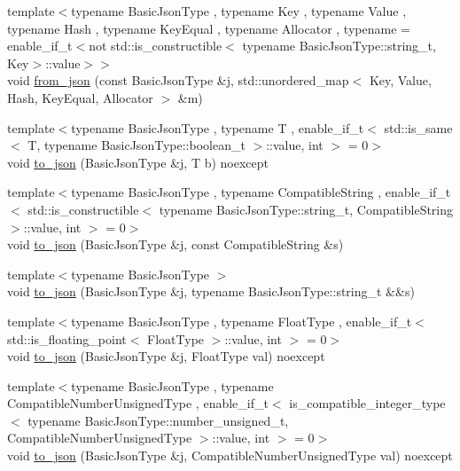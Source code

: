 \begin{DoxyCompactItemize}
\item 
{\footnotesize template$<$typename Basic\+Json\+Type , typename Key , typename Value , typename Hash , typename Key\+Equal , typename Allocator , typename  = enable\+\_\+if\+\_\+t$<$not std\+::is\+\_\+constructible$<$                                     typename Basic\+Json\+Type\+::string\+\_\+t, Key$>$\+::value$>$$>$ }\\void \hyperlink{namespacenlohmann_1_1detail_aef5c8ea108f4d2b03fb4a635617510de}{from\+\_\+json} (const Basic\+Json\+Type \&j, std\+::unordered\+\_\+map$<$ Key, Value, Hash, Key\+Equal, Allocator $>$ \&m)
\item 
{\footnotesize template$<$typename Basic\+Json\+Type , typename T , enable\+\_\+if\+\_\+t$<$ std\+::is\+\_\+same$<$ T, typename Basic\+Json\+Type\+::boolean\+\_\+t $>$\+::value, int $>$  = 0$>$ }\\void \hyperlink{namespacenlohmann_1_1detail_a1a804b98cbe89b7e44b698f2ca860490}{to\+\_\+json} (Basic\+Json\+Type \&j, T b) noexcept
\item 
{\footnotesize template$<$typename Basic\+Json\+Type , typename Compatible\+String , enable\+\_\+if\+\_\+t$<$ std\+::is\+\_\+constructible$<$ typename Basic\+Json\+Type\+::string\+\_\+t, Compatible\+String $>$\+::value, int $>$  = 0$>$ }\\void \hyperlink{namespacenlohmann_1_1detail_a7356ed05cdbbb080cee80e1211e1c6c9}{to\+\_\+json} (Basic\+Json\+Type \&j, const Compatible\+String \&s)
\item 
{\footnotesize template$<$typename Basic\+Json\+Type $>$ }\\void \hyperlink{namespacenlohmann_1_1detail_a4aa1ca6b7c61bf19d1f30ea5b669f68e}{to\+\_\+json} (Basic\+Json\+Type \&j, typename Basic\+Json\+Type\+::string\+\_\+t \&\&s)
\item 
{\footnotesize template$<$typename Basic\+Json\+Type , typename Float\+Type , enable\+\_\+if\+\_\+t$<$ std\+::is\+\_\+floating\+\_\+point$<$ Float\+Type $>$\+::value, int $>$  = 0$>$ }\\void \hyperlink{namespacenlohmann_1_1detail_a22bffdc8bc7e43af380ba2050696b230}{to\+\_\+json} (Basic\+Json\+Type \&j, Float\+Type val) noexcept
\item 
{\footnotesize template$<$typename Basic\+Json\+Type , typename Compatible\+Number\+Unsigned\+Type , enable\+\_\+if\+\_\+t$<$ is\+\_\+compatible\+\_\+integer\+\_\+type$<$ typename Basic\+Json\+Type\+::number\+\_\+unsigned\+\_\+t, Compatible\+Number\+Unsigned\+Type $>$\+::value, int $>$  = 0$>$ }\\void \hyperlink{namespacenlohmann_1_1detail_ae5fd66b5517b3b5a6c6b9fd9f29ba8dc}{to\+\_\+json} (Basic\+Json\+Type \&j, Compatible\+Number\+Unsigned\+Type val) noexcept

\end{DoxyCompactItemize}
